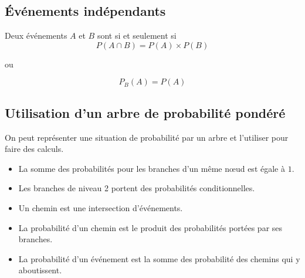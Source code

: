 \documentclass[12pt,a4paper]{article}
\begin{document}
\subsection{\'Evénements indépendants}

\begin{mybilan}
	Deux événements $A$ et $B$ sont  si et seulement si
	\begin{equation*}
		P(A \cap B) = P(A) \times P(B)
	\end{equation*}

	\begin{center}
		ou
	\end{center}
	
	\begin{equation*}
		P_B(A) = P(A)
	\end{equation*}
\end{mybilan}

\subsection{Utilisation d'un arbre de probabilité pondéré}	
\begin{mymeth}
	On peut représenter une situation de probabilité par un arbre et l'utiliser pour faire des calculs.\\
	\begin{itemize}
		\item La somme des probabilités pour les branches d'un même n\oe ud est égale à $1$.
		\item Les branches de niveau 2 portent des probabilités conditionnelles.
		\item Un chemin est une intersection d'événements.
		\item La probabilité d'un chemin est le produit des probabilités portées par ses branches.
		\item La probabilité d'un événement est la somme des probabilité des chemins qui y aboutissent.
	\end{itemize}

	
\end{mymeth}
	


\end{document}
